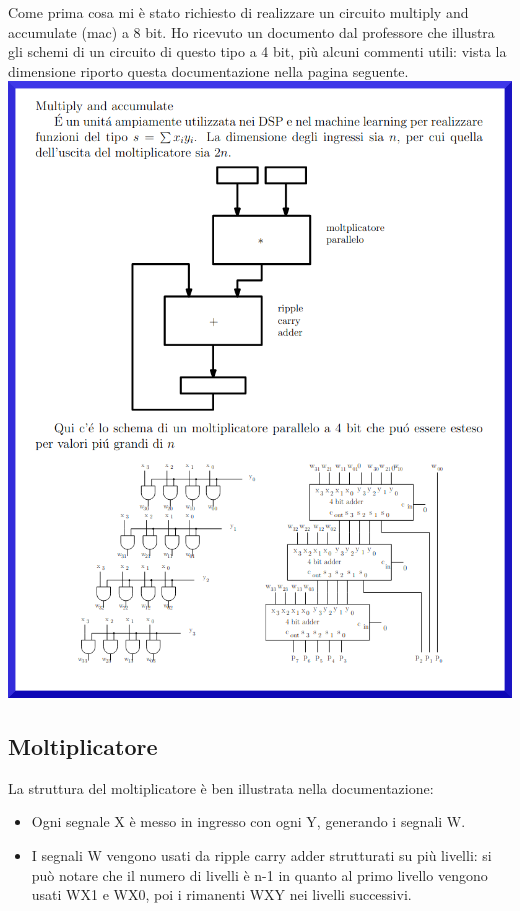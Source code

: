 \documentclass[12pt, letterpaper]{article}
\begin{document}
Come prima cosa mi è stato richiesto di realizzare un circuito multiply and accumulate (mac) a 8 bit.
Ho ricevuto un documento dal professore che illustra gli schemi di un circuito di questo tipo a 4 bit, più alcuni commenti utili: vista la dimensione riporto questa documentazione nella pagina seguente.
\newpage
\includegraphics[width=\textwidth]{mac.png}
\newpage

\subsection{Moltiplicatore}
La struttura del moltiplicatore è ben illustrata nella documentazione:

\begin{itemize}
  \item Ogni segnale X è messo in ingresso con ogni Y, generando i segnali W.
  \item I segnali W vengono usati da ripple carry adder strutturati su più livelli: si può notare che il numero di livelli è n-1 in quanto al primo livello vengono usati WX1 e WX0, poi i rimanenti WXY nei livelli successivi.
\end{itemize}
\end{document}
